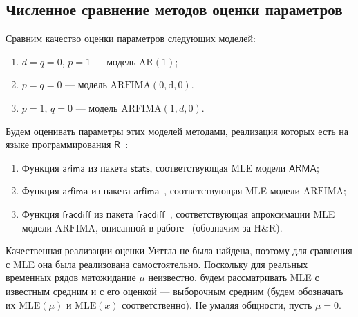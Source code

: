 \documentclass[specialist,
substylefile = spbu_report.rtx,
subf,href,colorlinks=true, 12pt]{disser}
\theoremstyle{definition}
\begin{document}
\subsection{Численное сравнение методов оценки параметров}\label{sect:est_param}
Сравним качество оценки параметров следующих моделей:
\begin{enumerate}
	\item $d=q=0$, $p=1$ --- модель $\mathrm{AR}(1)$;
	\item $p=q=0$ --- модель $\mathrm{ARFIMA(0, d, 0)}$.
	\item $p=1$, $q=0$ --- модель $\mathrm{ARFIMA}(1, d, 0)$.
\end{enumerate}
Будем оценивать параметры этих моделей методами, реализация которых есть на языке программирования $\mathsf{R}$~\cite{R}:
\begin{enumerate}
	\item Функция $\mathsf{arima}$ из пакета $\mathsf{stats}$, соответствующая MLE модели $\mathsf{ARMA}$;
	\item Функция $\mathsf{arfima}$ из пакета $\mathsf{arfima}$~\cite{Veenstra2012}, соответствующая MLE модели $\mathrm{ARFIMA}$;
	\item Функция $\mathsf{fracdiff}$ из пакета $\mathsf{fracdiff}$~\cite{Maechler1999}, соответствующая апроксимации MLE модели $\mathrm{ARFIMA}$, описанной в работе~\cite{Haslett1989} (обозначим за H\&R).
\end{enumerate}
Качественная реализации оценки Уиттла не была найдена, поэтому для сравнения с MLE она была реализована самостоятельно. Поскольку для реальных временных рядов матожидание $\mu$ неизвестно, будем рассматривать MLE с известным средним и с его оценкой --- выборочным средним (будем обозначать их $\mathrm{MLE}(\mu)$ и $\mathrm{MLE}(\bar x)$ соответственно). Не умаляя общности, пусть $\mu=0$.
\end{document}
